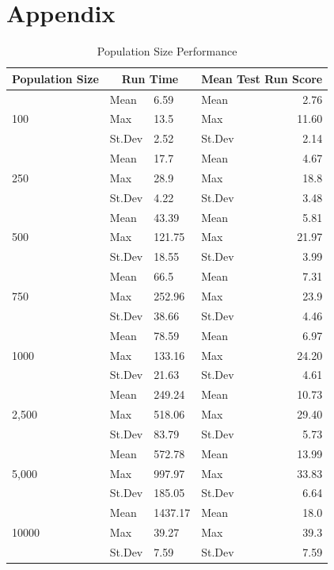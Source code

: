 \documentclass{article}
\begin{document}
\newpage
\raggedright
{}


\newpage
\section{Appendix}

\begin{table}[h]
\begin{center}
\begin{tabular}{|l|l|l|l|r|}
\hline%
\textbf{Population Size} & \multicolumn{2}{c|}{\textbf{Run Time}} & \multicolumn{2}{c|}{\textbf{Mean Test Run Score}} \\
\hline
\multirow{3}{*}{100}
& Mean & 6.59 & Mean & 2.76 \\
& Max & 13.5 & Max & 11.60 \\
& St.Dev & 2.52 & St.Dev & 2.14 \\
\hline
\multirow{3}{*}{250}
& Mean & 17.7 & Mean & 4.67 \\
& Max & 28.9 & Max & 18.8 \\
& St.Dev & 4.22 & St.Dev & 3.48 \\
\hline
\multirow{3}{*}{500}
& Mean & 43.39 & Mean & 5.81 \\
& Max & 121.75 & Max & 21.97 \\
& St.Dev & 18.55 & St.Dev & 3.99 \\
\hline
\multirow{3}{*}{750}
& Mean & 66.5 & Mean & 7.31 \\
& Max & 252.96 & Max & 23.9 \\
& St.Dev & 38.66 & St.Dev & 4.46 \\
\hline
\multirow{3}{*}{1000}
& Mean & 78.59 & Mean & 6.97 \\
& Max & 133.16 & Max & 24.20 \\
& St.Dev & 21.63 & St.Dev & 4.61 \\
\hline
\multirow{3}{*}{2,500}
& Mean & 249.24 & Mean & 10.73 \\
& Max & 518.06 & Max & 29.40 \\
& St.Dev & 83.79 & St.Dev & 5.73 \\
\hline
\multirow{3}{*}{5,000}
& Mean & 572.78 & Mean & 13.99 \\
& Max & 997.97 & Max & 33.83 \\
& St.Dev & 185.05 & St.Dev & 6.64 \\
\hline
\multirow{3}{*}{10000}
& Mean & 1437.17 & Mean & 18.0 \\
& Max & 39.27 & Max & 39.3 \\
& St.Dev & 7.59 & St.Dev & 7.59 \\
\hline
\end{tabular}
\end{center}
\caption{Population Size Performance}
\label{table:population_size}
\end{table}
\end{document}
